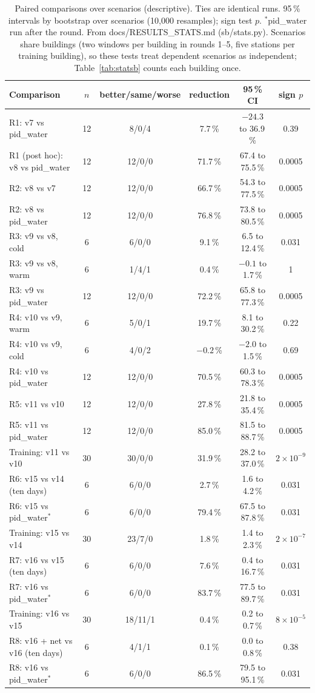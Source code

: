 \documentclass{article}
\begin{document}
\begin{table}[t]\centering
\caption{Paired comparisons over scenarios (descriptive). Ties are identical runs. 95\,\% intervals by bootstrap over
scenarios (10{,}000 resamples); sign test $p$. $^{*}$pid\_water run after the round. From docs/RESULTS\_STATS.md
(sb/stats.py). Scenarios share buildings (two windows per building in rounds 1--5, five stations per training
building), so these tests treat dependent scenarios as independent; Table~\ref{tab:statsb} counts each building once.}\label{tab:stats}
\small
\begin{tabular}{lccccc}\toprule
Comparison & $n$ & better/same/worse & reduction & 95\,\% CI & sign $p$\\\midrule
R1: v7 vs pid\_water & 12 & 8/0/4 & 7.7\,\% & $-24.3$ to 36.9\,\% & 0.39\\
R1 (post hoc): v8 vs pid\_water & 12 & 12/0/0 & 71.7\,\% & 67.4 to 75.5\,\% & 0.0005\\
R2: v8 vs v7 & 12 & 12/0/0 & 66.7\,\% & 54.3 to 77.5\,\% & 0.0005\\
R2: v8 vs pid\_water & 12 & 12/0/0 & 76.8\,\% & 73.8 to 80.5\,\% & 0.0005\\
R3: v9 vs v8, cold & 6 & 6/0/0 & 9.1\,\% & 6.5 to 12.4\,\% & 0.031\\
R3: v9 vs v8, warm & 6 & 1/4/1 & 0.4\,\% & $-0.1$ to 1.7\,\% & 1\\
R3: v9 vs pid\_water & 12 & 12/0/0 & 72.2\,\% & 65.8 to 77.3\,\% & 0.0005\\
R4: v10 vs v9, warm & 6 & 5/0/1 & 19.7\,\% & 8.1 to 30.2\,\% & 0.22\\
R4: v10 vs v9, cold & 6 & 4/0/2 & $-0.2$\,\% & $-2.0$ to 1.5\,\% & 0.69\\
R4: v10 vs pid\_water & 12 & 12/0/0 & 70.5\,\% & 60.3 to 78.3\,\% & 0.0005\\
R5: v11 vs v10 & 12 & 12/0/0 & 27.8\,\% & 21.8 to 35.4\,\% & 0.0005\\
R5: v11 vs pid\_water & 12 & 12/0/0 & 85.0\,\% & 81.5 to 88.7\,\% & 0.0005\\
Training: v11 vs v10 & 30 & 30/0/0 & 31.9\,\% & 28.2 to 37.0\,\% & $2\times10^{-9}$\\
R6: v15 vs v14 (ten days) & 6 & 6/0/0 & 2.7\,\% & 1.6 to 4.2\,\% & 0.031\\
R6: v15 vs pid\_water$^{*}$ & 6 & 6/0/0 & 79.4\,\% & 67.5 to 87.8\,\% & 0.031\\
Training: v15 vs v14 & 30 & 23/7/0 & 1.8\,\% & 1.4 to 2.3\,\% & $2\times10^{-7}$\\
R7: v16 vs v15 (ten days) & 6 & 6/0/0 & 7.6\,\% & 0.4 to 16.7\,\% & 0.031\\
R7: v16 vs pid\_water$^{*}$ & 6 & 6/0/0 & 83.7\,\% & 77.5 to 89.7\,\% & 0.031\\
Training: v16 vs v15 & 30 & 18/11/1 & 0.4\,\% & 0.2 to 0.7\,\% & $8\times10^{-5}$\\
R8: v16 + net vs v16 (ten days) & 6 & 4/1/1 & 0.1\,\% & 0.0 to 0.8\,\% & 0.38\\
R8: v16 vs pid\_water$^{*}$ & 6 & 6/0/0 & 86.5\,\% & 79.5 to 95.1\,\% & 0.031\\\bottomrule
\end{tabular}
\end{table}
\end{document}
